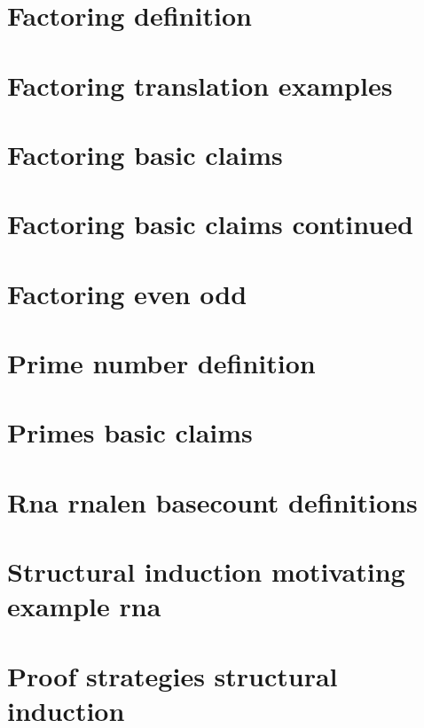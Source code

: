 \section*{Factoring definition}

\vfill
\section*{Factoring translation examples}

\vfill
\section*{Factoring basic claims}

\vfill
\section*{Factoring basic claims continued}

\vfill
\section*{Factoring even odd}

\vfill
\section*{Prime number definition}

\vfill
\section*{Primes basic claims}

\vfill
\section*{Rna rnalen basecount definitions}

\vfill
\section*{Structural induction motivating example rna}

\vfill
\section*{Proof strategies structural induction}

\vfill
